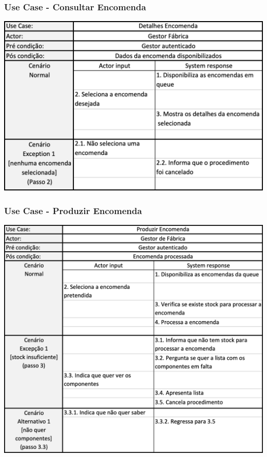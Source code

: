\subsubsection{Use Case - Consultar Encomenda}
\begin{center}
 	\includegraphics[width = 5.5in]{D_E_USECASE/uc_consultar_encomenda.png}
\end{center}
\subsubsection{Use Case - Produzir Encomenda}
\begin{center}
 	\includegraphics[width = 5.5in]{D_E_USECASE/uc_processar_encomenda.png}
\end{center}
\newpage